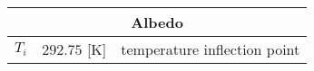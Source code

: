 \documentclass[../../main.tex]{subfiles}
\begin{document}
\begin{table}[htbp]
    \centering
    \begin{tabular}{|p{1cm}||p{4cm}|p{7cm}|}
        \hline
        \multicolumn{3}{|c|}{Albedo} \\
        \hline 
        $T_i$ & $292.75$ [K] & temperature inflection point \\
        \hline
    \end{tabular}
\end{table}
\end{document}
